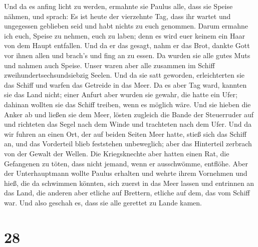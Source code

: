  Und da es anfing licht zu werden, ermahnte sie Paulus
alle, dass sie Speise nähmen, und sprach: Es ist heute der vierzehnte
Tag, dass ihr wartet und ungegessen geblieben seid und habt nichts zu
euch genommen.  Darum ermahne ich euch, Speise zu nehmen,
euch zu laben; denn es wird euer keinem ein Haar von dem Haupt
entfallen.  Und da er das gesagt, nahm er das Brot,
dankte Gott vor ihnen allen und brach's und fing an zu essen.
 Da wurden sie alle gutes Muts und nahmen auch Speise.
 Unser waren aber alle zusammen im Schiff
zweihundertsechsundsiebzig Seelen.  Und da sie satt
geworden, erleichterten sie das Schiff und warfen das Getreide in das
Meer.  Da es aber Tag ward, kannten sie das Land nicht;
einer Anfurt aber wurden sie gewahr, die hatte ein Ufer; dahinan wollten
sie das Schiff treiben, wenn es möglich wäre.  Und sie
hieben die Anker ab und ließen sie dem Meer, lösten zugleich die Bande
der Steuerruder auf und richteten das Segel nach dem Winde und
trachteten nach dem Ufer.  Und da wir fuhren an einen
Ort, der auf beiden Seiten Meer hatte, stieß sich das Schiff an, und das
Vorderteil blieb feststehen unbeweglich; aber das Hinterteil zerbrach
von der Gewalt der Wellen.  Die Kriegsknechte aber hatten
einen Rat, die Gefangenen zu töten, dass nicht jemand, wenn er
ausschwömme, entflöhe.  Aber der Unterhauptmann wollte
Paulus erhalten und wehrte ihrem Vornehmen und hieß, die da schwimmen
könnten, sich zuerst in das Meer lassen und entrinnen an das Land,
 die anderen aber etliche auf Brettern, etliche auf dem,
das vom Schiff war. Und also geschah es, dass sie alle gerettet zu Lande
kamen.

\hypertarget{section-27}{%
\section{28}\label{section-27}}

